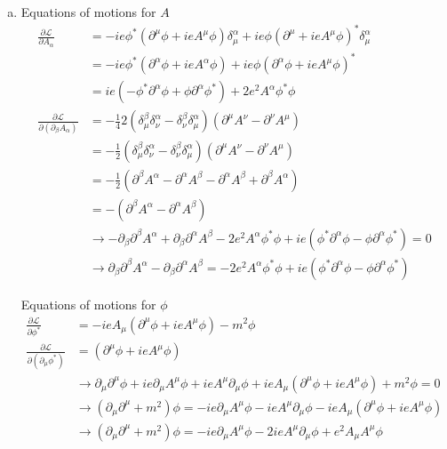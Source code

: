 \documentclass[../main.tex]{subfiles}
\begin{document}
\begin{enumerate}[(a)]
\item Equations of motions for $A$
\begin{align}
\frac{\partial\mathcal{L}}{\partial A_\alpha}
&=-ie\phi^*(\partial^\mu\phi+ieA^\mu\phi)\delta^\alpha_\mu+ie\phi(\partial^\mu+ieA^\mu\phi)^*\delta^\alpha_\mu\\
&=-ie\phi^*(\partial^\alpha\phi+ieA^\alpha\phi)+ie\phi(\partial^\alpha\phi+ieA^\mu\phi)^*\\
&=ie(-\phi^*\partial^\alpha\phi+\phi\partial^\alpha\phi^*)+2e^2A^\alpha\phi^*\phi\\
\frac{\partial\mathcal{L}}{\partial(\partial_\beta A_\alpha)}
&=-\frac{1}{4}2(\delta^\beta_\mu\delta^\alpha_\nu-\delta^\beta_\nu\delta^\alpha_\mu)(\partial^\mu A^\nu-\partial^\nu A^\mu)\\
&=-\frac{1}{2}(\delta^\beta_\mu\delta^\alpha_\nu-\delta^\beta_\nu\delta^\alpha_\mu)(\partial^\mu A^\nu-\partial^\nu A^\mu)\\
&=-\frac{1}{2}(\partial^\beta A^\alpha-\partial^\alpha A^\beta-\partial^\alpha A^\beta+\partial^\beta A^\alpha)\\
&=-(\partial^\beta A^\alpha-\partial^\alpha A^\beta)\\
&\rightarrow-\partial_\beta\partial^\beta A^\alpha+\partial_\beta\partial^\alpha A^\beta-2e^2A^\alpha\phi^*\phi+ie(\phi^*\partial^\alpha\phi-\phi\partial^\alpha\phi^*)=0\\
&\rightarrow\partial_\beta\partial^\beta A^\alpha-\partial_\beta\partial^\alpha A^\beta=-2e^2A^\alpha\phi^*\phi+ie(\phi^*\partial^\alpha\phi-\phi\partial^\alpha\phi^*)
\end{align}

Equations of motions for $\phi$
\begin{align}
\frac{\partial\mathcal{L}}{\partial\phi^*}
&=-ieA_\mu(\partial^\mu\phi+ieA^\mu\phi)-m^2\phi\\
\frac{\partial\mathcal{L}}{\partial(\partial_\mu\phi^*)}
&=(\partial^\mu\phi+ieA^\mu\phi)\\
&\rightarrow\partial_\mu\partial^\mu\phi+ie\partial_\mu A^\mu\phi+ieA^\mu\partial_\mu\phi+ieA_\mu(\partial^\mu\phi+ieA^\mu\phi)+m^2\phi=0\\
&\rightarrow(\partial_\mu\partial^\mu+m^2)\phi=-ie\partial_\mu A^\mu\phi-ieA^\mu\partial_\mu\phi-ieA_\mu(\partial^\mu\phi+ieA^\mu\phi)\\
&\rightarrow(\partial_\mu\partial^\mu+m^2)\phi=-ie\partial_\mu A^\mu\phi-2ieA^\mu\partial_\mu\phi+e^2A_\mu A^\mu\phi
\end{align}
\end{enumerate}
\end{document}
